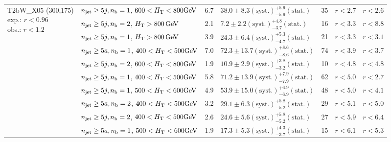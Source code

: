 \begin{table}[h!]
\begin{tabular}{ lllllll }
\multirow{10}{*}{\parbox[t]{2cm}{T2bW\_X05 (300,175)\\exp.: $r<0.96$\\obs.: $r<1.2$}}
 & $n_{\mathrm{jet}} \geq5j,n_{\text{b}} =1$, $600 < \mbox{$H_\text{T}$} < 800 \mathrm{GeV}$ & 6.7 & $38.0 \pm 8.3 \mathrm{(syst.)} ^{+5.9}_{-5.9} \mathrm{(stat.)}$ & 35 & $r < 2.7$ & $r < 2.6$\\ 
 & $n_{\mathrm{jet}} \geq5j,n_{\text{b}} =2$, $\mbox{$H_\text{T}$} > 800 \, \mathrm{GeV}$ & 2.1 & $7.2 \pm 2.2 \mathrm{(syst.)} ^{+4.8}_{-3.7} \mathrm{(stat.)}$ & 16 & $r < 3.3$ & $r < 8.8$\\ 
 & $n_{\mathrm{jet}} \geq5j,n_{\text{b}} =1$, $\mbox{$H_\text{T}$} > 800 \, \mathrm{GeV}$ & 3.9 & $24.3 \pm 6.4 \mathrm{(syst.)} ^{+5.3}_{-4.7} \mathrm{(stat.)}$ & 21 & $r < 3.3$ & $r < 3.1$\\ 
 & $n_{\mathrm{jet}} \geq5a,n_{\text{b}} =1$, $400 < \mbox{$H_\text{T}$} < 500 \mathrm{GeV}$ & 7.0 & $72.3 \pm 13.7 \mathrm{(syst.)} ^{+8.6}_{-8.6} \mathrm{(stat.)}$ & 74 & $r < 3.9$ & $r < 3.7$\\ 
 & $n_{\mathrm{jet}} \geq5j,n_{\text{b}} =2$, $600 < \mbox{$H_\text{T}$} < 800 \mathrm{GeV}$ & 1.9 & $10.9 \pm 2.9 \mathrm{(syst.)} ^{+3.8}_{-3.2} \mathrm{(stat.)}$ & 10 & $r < 4.8$ & $r < 4.8$\\ 
 & $n_{\mathrm{jet}} \geq5j,n_{\text{b}} =1$, $400 < \mbox{$H_\text{T}$} < 500 \mathrm{GeV}$ & 5.8 & $71.2 \pm 13.9 \mathrm{(syst.)} ^{+7.9}_{-7.9} \mathrm{(stat.)}$ & 62 & $r < 5.0$ & $r < 2.7$\\ 
 & $n_{\mathrm{jet}} \geq5j,n_{\text{b}} =1$, $500 < \mbox{$H_\text{T}$} < 600 \mathrm{GeV}$ & 4.9 & $53.9 \pm 15.0 \mathrm{(syst.)} ^{+6.9}_{-6.9} \mathrm{(stat.)}$ & 48 & $r < 5.0$ & $r < 4.1$\\ 
 & $n_{\mathrm{jet}} \geq5a,n_{\text{b}} =2$, $400 < \mbox{$H_\text{T}$} < 500 \mathrm{GeV}$ & 3.2 & $29.1 \pm 6.3 \mathrm{(syst.)} ^{+5.8}_{-5.2} \mathrm{(stat.)}$ & 29 & $r < 5.1$ & $r < 5.0$\\ 
 & $n_{\mathrm{jet}} \geq5j,n_{\text{b}} =2$, $400 < \mbox{$H_\text{T}$} < 500 \mathrm{GeV}$ & 2.6 & $24.6 \pm 5.6 \mathrm{(syst.)} ^{+5.8}_{-5.2} \mathrm{(stat.)}$ & 27 & $r < 5.9$ & $r < 6.4$\\ 
 & $n_{\mathrm{jet}} \geq5a,n_{\text{b}} =1$, $500 < \mbox{$H_\text{T}$} < 600 \mathrm{GeV}$ & 1.9 & $17.3 \pm 5.3 \mathrm{(syst.)} ^{+4.3}_{-3.7} \mathrm{(stat.)}$ & 15 & $r < 6.1$ & $r < 5.3$\\ \hline
    \hline
  \end{tabular}
\end{table}

